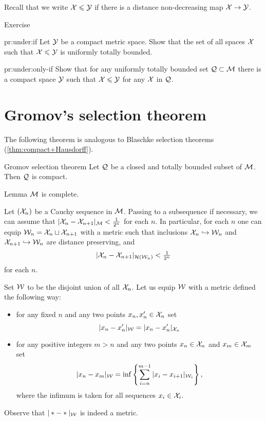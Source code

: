 Recall that we write $\mathcal{X}\leqslant\mathcal{Y}$ if there is a distance non-decreasing map $\mathcal{X}\to\mathcal{Y}$.

\begin{thm}{Exercise}\label{pr:under}

\begin{subthm}{pr:under:if}
Let $\mathcal{Y}$ be a compact metric space.
Show that the set of all spaces $\mathcal{X}$ such that $\mathcal{X}\leqslant\mathcal{Y}$
is uniformly totally bounded.
\end{subthm}

\begin{subthm}{pr:under:only-if}
Show that for any uniformly totally bounded set $\mathcal{Q}\subset\mathcal{M}$ there is a compact space $\mathcal{Y}$
such that $\mathcal{X}\leqslant\mathcal{Y}$ for any $\mathcal{X}$ in $\mathcal{Q}$.
\end{subthm}

\end{thm}

\section{Gromov's selection theorem}

The following theorem is analogous to Blaschke selection theorems (\ref{thm:compact+Hausdorff}).

\begin{thm}{Gromov selection theorem}\label{thm:gromov-compactness}%
Let $\mathcal{Q}$ be a closed and totally bounded subset of $\mathcal{M}$.
Then $\mathcal{Q}$ is compact.
\end{thm}

\begin{thm}{Lemma}
$\mathcal{M}$ is complete.
\end{thm}

Let $(\mathcal{X}_n)$ be a Cauchy sequence in $\mathcal{M}$.
Passing to a subsequence if necessary, 
we can assume that $|\mathcal{X}_n-\mathcal{X}_{n+1}|_{\mathcal{M}}<\tfrac1{2^n}$ for each $n$.
In particular, for each $n$ one can equip $\mathcal{W}_n=\mathcal{X}_n \sqcup \mathcal{X}_{n+1}$ with a metric such that
inclusions $\mathcal{X}_n\hookrightarrow \mathcal{W}_n$ and $\mathcal{X}_{n+1}\hookrightarrow \mathcal{W}_n$ are distance preserving,
and $$|\spc{X}_n-\spc{X}_{n+1}|_{\mathcal{H}(\spc{W}_n)}\z<\tfrac1{2^n}$$
for each $n$.

Set $\mathcal{W}$ to be the disjoint union of all $\mathcal{X}_n$.
Let us equip $\mathcal{W}$ with a metric defined the following way:
\begin{itemize}
\item for any fixed $n$ and any two points $x_n,x_n'\in \mathcal{X}_n$ set
$$|x_n-x_n'|_{\mathcal{W}}=|x_n-x_n'|_{\mathcal{X}_n}$$
\item for any positive integers $m>n$ and any two points $x_n\in \mathcal{X}_n$ and $x_m\in \mathcal{X}_m$ set
$$|x_n-x_m|_{\mathcal{W}}=\inf\left\{\sum_{i=n}^{m-1}|x_i-x_{i+1}|_{\mathcal{W}_i}\right\},$$
where the infimum is taken for all sequences $x_i\in \mathcal{X}_i$.
\end{itemize}
Observe that $|*-*|_{\mathcal{W}}$ is indeed a metric.


